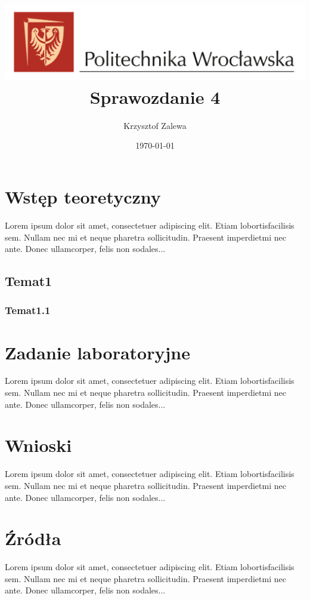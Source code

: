 \documentclass{article}
\title{
  \centering
  \includegraphics[width=\textwidth]{src/images/logo_PWr_kolor_poziom.png}\\
  \fontsize{28pt}{30pt}\selectfont Sprawozdanie 4\\
  \fontsize{14pt}{30pt}\selectfont }
\author{Krzysztof Zalewa}
\date{\daymonthyear\today}
\begin{document}
  \maketitle
  \pagebreak
  \tableofcontents
  
  \section{Wstęp teoretyczny}
  
  Lorem  ipsum  dolor  sit  amet,  consectetuer  adipiscing  
  elit.   Etiam  lobortisfacilisis sem.  Nullam nec mi et 
  neque pharetra sollicitudin.  Praesent imperdietmi nec ante. 
  Donec ullamcorper, felis non sodales...
  \subsection{Temat1}
  \subsubsection{Temat1.1}

  \section{Zadanie laboratoryjne}
  Lorem  ipsum  dolor  sit  amet,  consectetuer  adipiscing  
  elit.   Etiam  lobortisfacilisis sem.  Nullam nec mi et 
  neque pharetra sollicitudin.  Praesent imperdietmi nec ante. 
  Donec ullamcorper, felis non sodales...

  \section{Wnioski}
  Lorem  ipsum  dolor  sit  amet,  consectetuer  adipiscing  
  elit.   Etiam  lobortisfacilisis sem.  Nullam nec mi et 
  neque pharetra sollicitudin.  Praesent imperdietmi nec ante. 
  Donec ullamcorper, felis non sodales...
  
  \section{Źródła}
  Lorem  ipsum  dolor  sit  amet,  consectetuer  adipiscing  
  elit.   Etiam  lobortisfacilisis sem.  Nullam nec mi et 
  neque pharetra sollicitudin.  Praesent imperdietmi nec ante. 
  Donec ullamcorper, felis non sodales...
\end{document}
